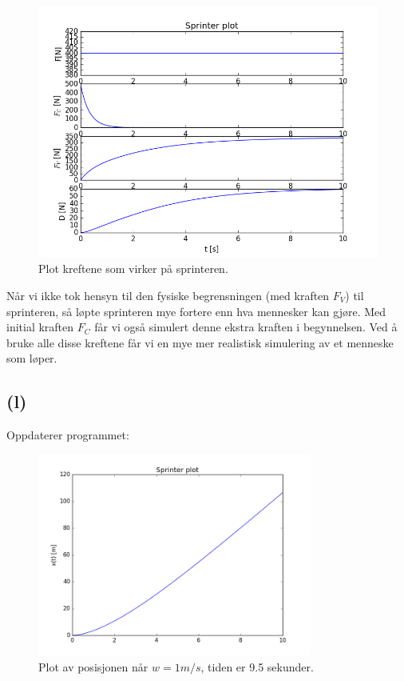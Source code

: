 \documentclass[a4paper,norsk,12pt]{article}
\begin{document}
\begin{figure}[H]

  \includegraphics[width=\linewidth]{sprinter04.png}

  \caption{Plot kreftene som virker på sprinteren. }
  \label{fig:plot6}

\end{figure}

\noindent
Når vi ikke tok hensyn til den fysiske begrensningen (med kraften $F_V$) til sprinteren, så løpte sprinteren mye fortere enn hva mennesker kan gjøre. Med initial kraften $F_C$ får vi også simulert denne ekstra kraften i begynnelsen. Ved å bruke alle disse kreftene får vi en mye mer realistisk simulering av et menneske som løper.\\


\noindent
\subsection*{(l)}

\noindent
Oppdaterer programmet:



\begin{figure}[H]
  \includegraphics[width=90mm]{sprinter05.png}
  \caption{Plot av posisjonen når $w = 1 m/s$, tiden er 9.5 sekunder.}
  \label{fig:plot7}
\end{figure}
\end{document}

